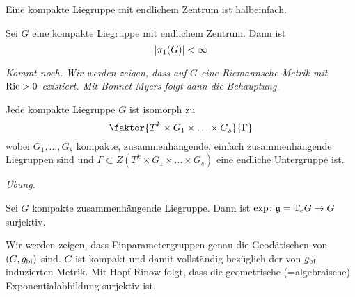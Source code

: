 \begin{korollarB}
	Eine kompakte Liegruppe mit endlichem Zentrum ist halbeinfach.
\end{korollarB}

\begin{lemma}[{name={Weyl}}]
	Sei $G$ eine kompakte Liegruppe mit endlichem Zentrum.
	Dann ist 
	\[
		\abs*{\pi_1(G)} < \infty
	\]
\end{lemma}
\begin{beweis}
	\emph{Kommt noch. Wir werden zeigen, dass auf $G$ eine Riemannsche Metrik mit $\Ric >0$ existiert. Mit Bonnet-Myers folgt dann die Behauptung.}
\end{beweis}

\begin{korollar}
	Jede kompakte Liegruppe $G$ ist isomorph zu 
	\[
		\faktor{T^k \times G_1 \times \ldots \times G_s}{\Gamma}
	\]
	wobei $G_1, \ldots ,G_s$ kompakte, zusammenhängende, einfach zusammenhängende Liegruppen sind und $\Gamma \subset Z(T^k \times G_1 \times \ldots \times G_s)$ eine endliche Untergruppe ist.
\end{korollar}
\begin{beweis}
	\emph{Übung.}
\end{beweis}

\begin{lemma}
	Sei $G$ kompakte zusammenhängende Liegruppe.
	Dann ist $\exp\colon \mathfrak{g} = \Tmap_e G \to G$ surjektiv.
\end{lemma}
\begin{beweis}
	Wir werden zeigen, dass Einparametergruppen genau die Geodätischen von $(G,g_\bi)$ sind. 
	$G$ ist kompakt und damit vollständig bezüglich der von $g_\bi$ induzierten Metrik.
	Mit Hopf-Rinow folgt, dass die geometrische (=algebraische) Exponentialabbildung surjektiv ist.
\end{beweis}
\newpage


